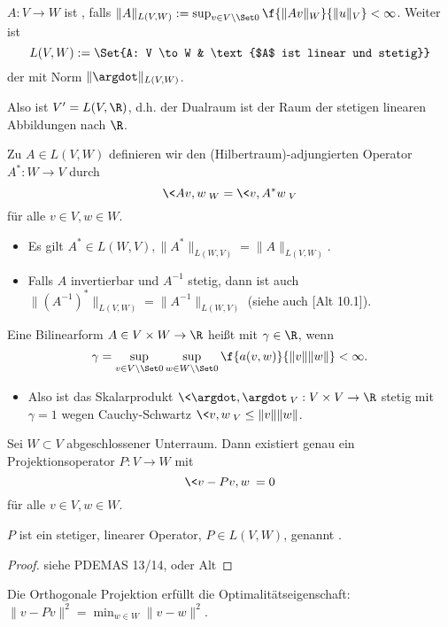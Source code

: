 \begin{df} \label{3.14}
	$A: V \to W$ ist , falls $\|A\|_{L(V,W)} := \sup_{v \in V\setminus \Set 0} \f{\|Av\|_W}{\|u\|_V} < \infty$.
	Weiter ist
	\[
		L(V,W) := \Set{A: V \to W & \text{$A$ ist linear und stetig}}
	\]
	der  mit Norm $\|\argdot\|_{L(V,W)}$.
	\begin{note}
		Also ist $V' = L(V, \R)$, d.h. der Dualraum ist der Raum der stetigen linearen Abbildungen nach $\R$.
	\end{note}
\end{df}

\begin{df} \label{3.15}
	Zu $A \in L(V,W)$ definieren wir den (Hilbertraum)-adjungierten Operator $A^*: W \to V$ durch
	\[
		\<Av,w\>_W = \<v,A^*w\>_V
	\]
	für alle $v \in V, w \in W$.
	\begin{note}
		\begin{itemize}
			\item
				Es gilt $A^* \in L(W,V), \|A^*\|_{L(W,V)} = \|A\|_{L(V,W)}$.
			\item
				Falls $A$ invertierbar und $A^{-1}$ stetig, dann ist auch $\|(A^{-1})^*\|_{L(V,W)} = \|A^{-1}\|_{L(W,V)}$ (siehe auch [Alt 10.1]).
		\end{itemize}
	\end{note}
\end{df}

\begin{df} \label{3.16}
	Eine Bilinearform $A \in V \times W \to \R$ heißt  mit  $\gamma \in \R$, wenn
	\[
		\gamma = \sup_{v \in V\setminus \Set 0} \sup_{w \in W \setminus \Set 0} \f{a(v,w)}{\|v\|\|w\|} < \infty.
	\]
	\begin{note}
		\begin{itemize}
			\item
				Also ist das Skalarprodukt $\<\argdot, \argdot\>_V: V \times V \to \R$ stetig mit $\gamma = 1$ wegen Cauchy-Schwartz $\<v, w\>_V \le \|v\|\|w\|$.
		\end{itemize}
	\end{note}
\end{df}

\begin{st}[Projektionssatz] \label{3.17}
	Sei $W \subset V$ abgeschlossener Unterraum.
	Dann existiert genau ein Projektionsoperator $P: V \to W$ mit
	\[
		\<v - Pv, w\> = 0
	\]
	für alle $v \in V, w \in W$.

	$P$ ist ein stetiger, linearer Operator, $P \in L(V,W)$, genannt .
	\begin{proof}
		siehe PDEMAS 13/14, oder Alt
	\end{proof}
	\begin{note}
		Die Orthogonale Projektion erfüllt die Optimalitätseigenschaft: $\|v - Pv\|^2 = \min_{w\in W} \|v - w\|^2$.
	\end{note}
\end{st}

